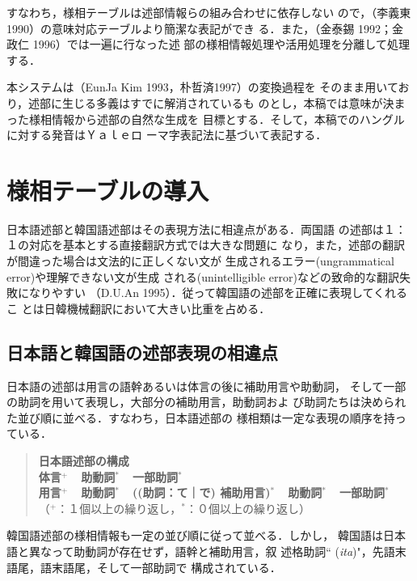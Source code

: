 すなわち，様相テーブルは述部情報らの組み合わせに依存しない
ので，（李義東 1990）の意味対応テーブルより簡潔な表記ができ
る．また，（金泰錫 1992；金政仁 1996）では一遍に行なった述
部の様相情報処理や活用処理を分離して処理する．

本システムは（EunJa Kim 1993，朴哲済1997）の変換過程を
そのまま用いており，述部に生じる多義はすでに解消されているも
のとし，本稿では意味が決まった様相情報から述部の自然な生成を
目標とする．そして，本稿でのハングルに対する発音はＹａｌｅロ
ーマ字表記法に基づいて表記する．

\section{様相テーブルの導入}
日本語述部と韓国語述部はその表現方法に相違点がある．両国語
の述部は１：１の対応を基本とする直接翻訳方式では大きな問題に
なり，また，述部の翻訳が間違った場合は文法的に正しくない文が
生成されるエラー(ungrammatical error)や理解できない文が生成
される(unintelligible error)などの致命的な翻訳失敗になりやすい
（D.U.An 1995）．従って韓国語の述部を正確に表現してくれるこ
とは日韓機械翻訳において大きい比重を占める．

\subsection{日本語と韓国語の述部表現の相違点}
日本語の述部は用言の語幹あるいは体言の後に補助用言や助動詞，
そして一部の助詞を用いて表現し，大部分の補助用言，助動詞およ
び助詞たちは決められた並び順に並べる．すなわち，日本語述部の
様相類は一定な表現の順序を持っている．

\vspace{3mm}
\begin{quote}
{\bf
日本語述部の構成\\
体言{\footnotesize ${^{+}}$}\ \ 
助動詞{\footnotesize ${^{*}}$}\ \ 
一部助詞{\footnotesize ${^{*}}$}\\
用言{\footnotesize ${^{+}}$}\ \ 
助動詞{\footnotesize ${^{*}}$}\ \ 
((助詞：て｜で) 補助用言){\footnotesize ${^{*}}$}\ \ 
助動詞{\footnotesize ${^{*}}$}\ \ 
一部助詞{\footnotesize ${^{*}}$}\\
}
{\footnotesize （$^{+}$：１個以上の繰り返し，$^{*}$：０個以上の繰り返し）}
\end{quote}
\vspace{3mm}

韓国語述部の様相情報も一定の並び順に従って並べる．しかし，
韓国語は日本語と異なって助動詞が存在せず，語幹と補助用言，叙
述格助詞“\hg{'ida} ({\it ita})"，先語末語尾，語末語尾，そして一部助詞で
構成されている．

